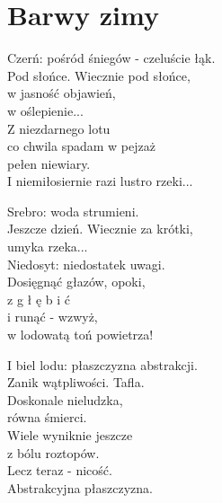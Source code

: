 \section{Barwy zimy}
\begin{text}
Czerń: pośród śniegów - czeluście łąk.\\
Pod słońce. Wiecznie pod słońce,\\
w jasność objawień,\\
w oślepienie...\\
Z niezdarnego lotu\\
co chwila spadam w pejzaż\\
pełen niewiary.\\
I niemiłosiernie razi lustro rzeki...

Srebro: woda strumieni.\\
Jeszcze dzień. Wiecznie za krótki,\\
umyka rzeka...\\
Niedosyt: niedostatek uwagi.\\
Dosięgnąć głazów, opoki,\\
z g ł ę b i ć\\
i runąć - wzwyż,\\
w lodowatą toń powietrza!

I biel lodu: płaszczyzna abstrakcji.\\
Zanik wątpliwości. Tafla.\\
Doskonale nieludzka,\\
równa śmierci.\\
Wiele wyniknie jeszcze\\
z bólu roztopów.\\
Lecz teraz - nicość.\\
Abstrakcyjna płaszczyzna.
\end{text}